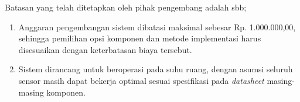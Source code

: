 \documentclass{elsinta}
\begin{document}
Batasan yang telah ditetapkan oleh pihak pengembang adalah sbb;
\begin{enumerate}
    \item Anggaran pengembangan sistem dibatasi maksimal sebesar Rp. 1.000.000,00, sehingga pemilihan opsi komponen dan metode implementasi harus disesuaikan dengan keterbatasan biaya tersebut.
    \item Sistem dirancang untuk beroperasi pada suhu ruang, dengan asumsi seluruh sensor masih dapat bekerja optimal sesuai spesifikasi pada \textit{datasheet} masing-masing komponen.
\end{enumerate}

\section{\BusinessAnalysisTitle}



\subsection{\MarketNeedsTitle}
\end{document}

